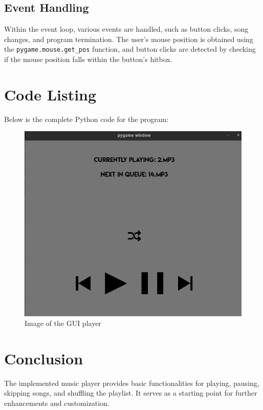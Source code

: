 \documentclass{article}
\begin{document}
\subsection{Event Handling}
Within the event loop, various events are handled, such as button clicks, song changes, and program termination. The user's mouse position is obtained using the \texttt{pygame.mouse.get\_pos} function, and button clicks are detected by checking if the mouse position falls within the button's hitbox.
\section{Code Listing}
Below is the complete Python code for the program:



\begin{figure}[ht]
        \centering
        \includegraphics[width=0.8\linewidth]{GUI.png}
        \caption{Image of the GUI player}
        \label{fig:view}
\end{figure}

\section{Conclusion}
The implemented music player provides basic functionalities for playing, pausing, skipping songs, and shuffling the playlist. It serves as a starting point for further enhancements and customization.
\end{document}

